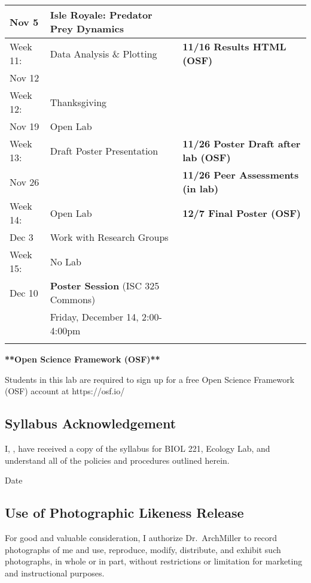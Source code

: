 \documentclass{tufte-handout}
\begin{document}
\begin{tabular}{l l l}
Nov 5 & Isle Royale: Predator Prey Dynamics & \\
\hline
Week 11: & Data Analysis \& Plotting & \textbf{11/16 Results HTML (OSF)} \\
Nov 12 \\
\hline
Week 12: & Thanksgiving \\
Nov 19 & Open Lab \\
\hline
Week 13: & Draft Poster Presentation & \textbf{11/26 Poster Draft after lab (OSF)}\\
Nov 26 &  & \textbf{11/26 Peer Assessments (in lab)}\\
\hline
Week 14: & Open Lab &  \textbf{12/7 Final Poster (OSF)} \\
Dec 3 & Work with Research Groups &\\
\hline 
Week 15: & No Lab & \\
Dec 10 & \textbf{Poster Session} (ISC 325 Commons) &  \\
 & Friday, December 14, 2:00-4:00pm \\
\hline
\\
\end{tabular}

\begin{fullwidth}

\textbf{**Open Science Framework (OSF)**} 											%

Students in this lab are required to sign up for a free Open Science Framework (OSF) account at https://osf.io/


\end{fullwidth}

\newpage

\subsection{Syllabus Acknowledgement}

I, \underline{\hspace{5cm}}, have received a copy of the syllabus for BIOL 221, Ecology Lab, and understand all of the policies and procedures outlined herein. 

  \underline{\hspace{5cm}} {Date}  \hrulefill


\subsection{Use of Photographic Likeness Release}

For good and valuable consideration, I authorize Dr.~ArchMiller to record photographs of me and use, reproduce, modify, distribute, and exhibit such photographs, in whole or in part, without restrictions or limitation for marketing and instructional purposes. 
\end{document}
